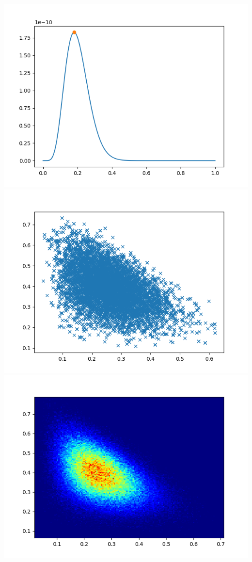 \documentclass[pt12]{article}
\begin{document}
\newpage

\begin{center}
\includegraphics[scale=0.5]{hip26.png}\\
\includegraphics[scale=0.5]{sc26.png}\\
\includegraphics[scale=0.5]{den26.png}\\
\end{center}
\end{document}
